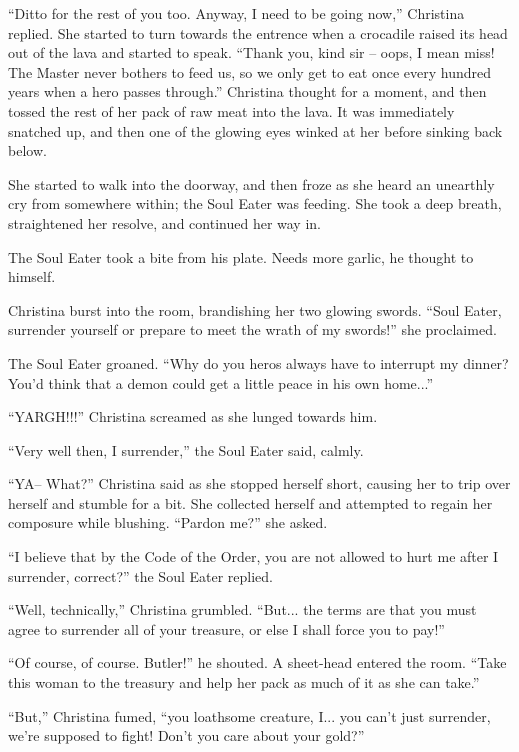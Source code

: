 \documentclass[showtrims,b6paper,draft,10pt]{memoir}
\begin{document}
``Ditto for the rest of you too.  Anyway, I need to be going now,'' Christina replied.  She started to turn towards the entrence when a crocadile raised its head out of the lava and started to speak.  ``Thank you, kind sir -- oops, I mean miss!  The Master never bothers to feed us, so we only get to eat once every hundred years when a hero passes through.''  Christina thought for a moment, and then tossed the rest of her pack of raw meat into the lava.  It was immediately snatched up, and then one of the glowing eyes winked at her before sinking back below.

She started to walk into the doorway, and then froze as she heard an unearthly cry from somewhere within;  the Soul Eater was feeding.  She took a deep breath, straightened her resolve, and continued her way in.

\timeskip
The Soul Eater took a bite from his plate.  Needs more garlic, he thought to himself.

Christina burst into the room, brandishing her two glowing swords.  ``Soul Eater, surrender yourself or prepare to meet the wrath of my swords!''  she proclaimed.

The Soul Eater groaned.  ``Why do you heros always have to interrupt my dinner?  You'd think that a demon could get a little peace in his own home...''

``YARGH!!!''  Christina screamed as she lunged towards him.

``Very well then, I surrender,'' the Soul Eater said, calmly.

``YA-- What?'' Christina said as she stopped herself short, causing her to trip over herself and stumble for a bit.  She collected herself and attempted to regain her composure while blushing.  ``Pardon me?'' she asked.

``I believe that by the Code of the Order, you are not allowed to hurt me after I surrender, correct?'' the Soul Eater replied.

``Well, technically,'' Christina grumbled.  ``But... the terms are that you must agree to surrender all of your treasure, or else I shall force you to pay!''

``Of course, of course.  Butler!''  he shouted.  A sheet-head entered the room.  ``Take this woman to the treasury and help her pack as much of it as she can take.''

``But,'' Christina fumed, ``you loathsome creature, I... you can't just surrender, we're supposed to fight!  Don't you care about your gold?''
\end{document}
